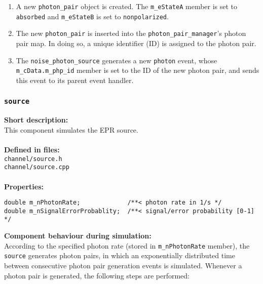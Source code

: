 \begin{enumerate}

\item A new \texttt{photon\_pair} object is created. The \texttt{m\_eStateA} member is set to \texttt{absorbed} and \texttt{m\_eStateB} is set to \texttt{nonpolarized}.

\item The new \texttt{photon\_pair} is inserted into the \texttt{photon\_pair\_manager}'s photon pair map. In doing so, a unique identifier (ID) is assigned to the photon pair.

\item The \texttt{noise\_photon\_source} generates a new \texttt{photon} event, whose \texttt{m\_cData.m\_php\_id} member is set to the ID of the new photon pair, and sends this event to its parent event handler.

\end{enumerate}


\subsubsection{\texttt{source}}

\textbf{Short description:}\\
This component simulates the EPR source.\\
\\
\textbf{Defined in files:}\\
\texttt{channel/source.h}\\
\texttt{channel/source.cpp}\\
\\
\textbf{Properties:}
\begin{lstlisting}
double m_nPhotonRate;             /**< photon rate in 1/s */
double m_nSignalErrorProbablity;  /**< signal/error probability [0-1] */
\end{lstlisting}
\noindent
\textbf{Component behaviour during simulation:}\\
According to the specified photon rate (stored in \texttt{m\_nPhotonRate} member), the \texttt{source} generates photon pairs, in which an exponentially distributed time between consecutive photon pair generation events is simulated. Whenever a photon pair is generated, the following steps are performed:

